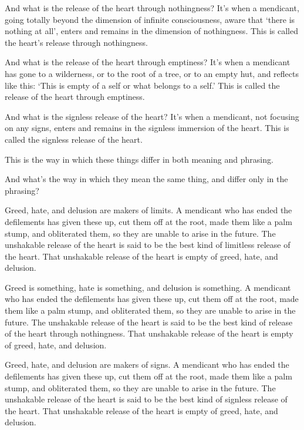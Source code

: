 \documentclass[12pt,openany]{book}%
\begin{document}
And what is the release of the heart through nothingness? It’s when a mendicant, going totally beyond the dimension of infinite consciousness, aware that ‘there is nothing at all’, enters and remains in the dimension of nothingness. This is called the heart’s release through nothingness. 

And what is the release of the heart through emptiness? It’s when a mendicant has gone to a wilderness, or to the root of a tree, or to an empty hut, and reflects like this: ‘This is empty of a self or what belongs to a self.’ This is called the release of the heart through emptiness. 

And what is the signless release of the heart? It’s when a mendicant, not focusing on any signs, enters and remains in the signless immersion of the heart. This is called the signless release of the heart. 

This is the way in which these things differ in both meaning and phrasing. 

And what’s the way in which they mean the same thing, and differ only in the phrasing? 

Greed, hate, and delusion are makers of limits. A mendicant who has ended the defilements has given these up, cut them off at the root, made them like a palm stump, and obliterated them, so they are unable to arise in the future. The unshakable release of the heart is said to be the best kind of limitless release of the heart. That unshakable release of the heart is empty of greed, hate, and delusion. 

Greed is something, hate is something, and delusion is something. A mendicant who has ended the defilements has given these up, cut them off at the root, made them like a palm stump, and obliterated them, so they are unable to arise in the future. The unshakable release of the heart is said to be the best kind of release of the heart through nothingness. That unshakable release of the heart is empty of greed, hate, and delusion. 

Greed, hate, and delusion are makers of signs. A mendicant who has ended the defilements has given these up, cut them off at the root, made them like a palm stump, and obliterated them, so they are unable to arise in the future. The unshakable release of the heart is said to be the best kind of signless release of the heart. That unshakable release of the heart is empty of greed, hate, and delusion. 
\end{document}
